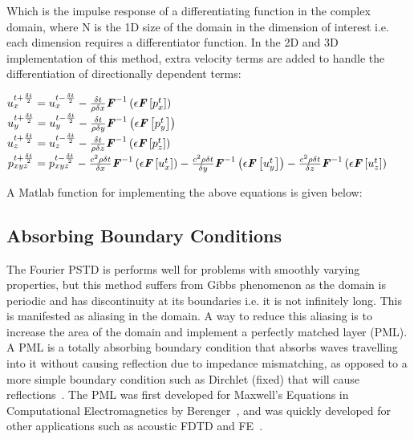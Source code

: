 Which is the impulse response of a differentiating function in the complex domain, where N is the 1D size of the domain in the dimension of interest i.e. each dimension requires a differentiator function. In the 2D and 3D implementation of this method, extra velocity terms are added to handle the differentiation of directionally dependent terms:\\
\begin{center}
$u^{t + \frac{\delta t}{2}}_{x} = u^{t - \frac{\delta t}{2}}_{x} - \frac{\delta t}{\rho \delta x} \textbf{\textit{F}}^{-1}\left(\epsilon \textbf{\textit{F}}\left[p^{t}_{x}\right] \right)$\\
$u^{t + \frac{\delta t}{2}}_{y} = u^{t - \frac{\delta t}{2}}_{y} - \frac{\delta t}{\rho \delta y} \textbf{\textit{F}}^{-1}\left(\epsilon \textbf{\textit{F}}\left[p^{t}_{y}\right] \right)$\\
$u^{t + \frac{\delta t}{2}}_{z} = u^{t - \frac{\delta t}{2}}_{z} - \frac{\delta t}{\rho \delta z} \textbf{\textit{F}}^{-1}\left(\epsilon \textbf{\textit{F}}\left[p^{t}_{z}\right] \right)$\\
$p^{t + \frac{\delta t}{2}}_{xyz} = p^{t - \frac{\delta t}{2}}_{xyz} - \frac{c^2 \rho \delta t}{\delta x} \textbf{\textit{F}}^{-1}\left( \epsilon \textbf{\textit{F}} \left[ u_x^{t} \right] \right) - \frac{c^2 \rho \delta t}{\delta y} \textbf{\textit{F}}^{-1}\left( \epsilon \textbf{\textit{F}} \left[ u_y^{t} \right] \right) - \frac{c^2 \rho \delta t}{\delta z} \textbf{\textit{F}}^{-1}\left( \epsilon \textbf{\textit{F}} \left[ u_z^{t} \right] \right)$ \\
\end{center}
A Matlab function for implementing the above equations is given below:\\

%

\subsection{Absorbing Boundary Conditions}
The Fourier PSTD is performs well for problems with smoothly varying properties, but this method suffers from Gibbs phenomenon as the domain is periodic and has discontinuity at its boundaries i.e. it is not infinitely long. This is manifested as aliasing in the domain. A way to reduce this aliasing is to increase the area of the domain and implement a perfectly matched layer (PML). A PML is a totally absorbing boundary condition that absorbs waves travelling into it without causing reflection due to impedance mismatching, as opposed to a more simple boundary condition such as Dirchlet (fixed) that will cause reflections~\cite{Rumpf2012a}. The PML was first developed for Maxwell's Equations in Computational Electromagnetics by Berenger~\cite{Berenger1994}, and was quickly developed for other applications such as acoustic FDTD and FE~\cite{Liu1997}.\\

